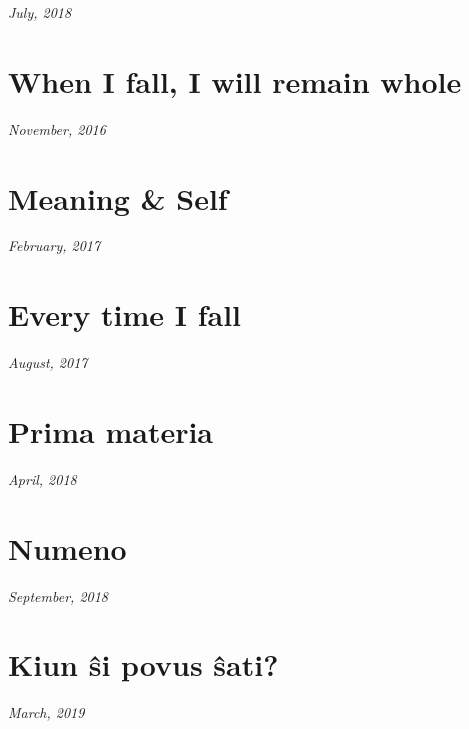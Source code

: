 \documentclass[10pt]{memoir}
\begin{document}
  \hfill\textit{July, 2018}

  
  \newpage


  \section{When I fall, I will remain whole}

  \hfill\textit{November, 2016}

  
  \cleartoverso


  \section{Meaning \& Self}

  \hfill\textit{February, 2017}

  
  \newpage

  \section{Every time I fall}

  \hfill\textit{August, 2017}

  
  \newpage


  \section{Prima materia}

  \hfill\textit{April, 2018}

  
  \newpage


  \section{Numeno}

  \hfill\textit{September, 2018}

  
  \newpage


  \section{Kiun ŝi povus ŝati?}

  \hfill\textit{March, 2019}

  
  \newpage
\end{document}
